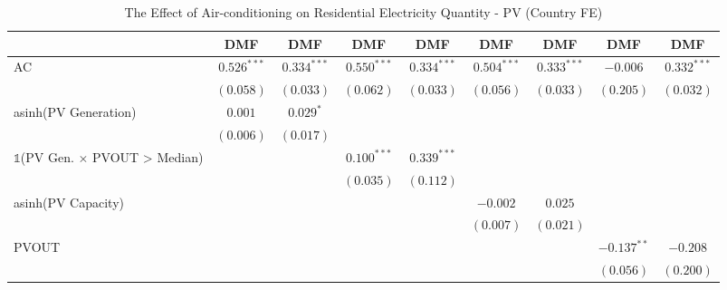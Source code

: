 
\begin{table}[htbp]
\caption{The Effect of Air-conditioning on Residential Electricity Quantity - PV (Country FE)}
\begin{center}
\begin{tabular}{l c c c c c c c c}
\hline
 & DMF & DMF & DMF & DMF & DMF & DMF & DMF & DMF \\
\hline
AC                                                        & $0.526^{***}$  & $0.334^{***}$  & $0.550^{***}$  & $0.334^{***}$  & $0.504^{***}$  & $0.333^{***}$  & $-0.006$       & $0.332^{***}$ \\
                                                          & $(0.058)$      & $(0.033)$      & $(0.062)$      & $(0.033)$      & $(0.056)$      & $(0.033)$      & $(0.205)$      & $(0.032)$     \\
asinh(PV Generation)                                      & $0.001$        & $0.029^{*}$    &                &                &                &                &                &               \\
                                                          & $(0.006)$      & $(0.017)$      &                &                &                &                &                &               \\
$\mathds{1}$(PV Gen. $\times$ PVOUT > Median)             &                &                & $0.100^{***}$  & $0.339^{***}$  &                &                &                &               \\
                                                          &                &                & $(0.035)$      & $(0.112)$      &                &                &                &               \\
asinh(PV Capacity)                                        &                &                &                &                & $-0.002$       & $0.025$        &                &               \\
                                                          &                &                &                &                & $(0.007)$      & $(0.021)$      &                &               \\
PVOUT                                                     &                &                &                &                &                &                & $-0.137^{**}$  & $-0.208$      \\
                                                          &                &                &                &                &                &                & $(0.056)$      & $(0.200)$     \\

\end{tabular}
\end{center}
\end{table}
